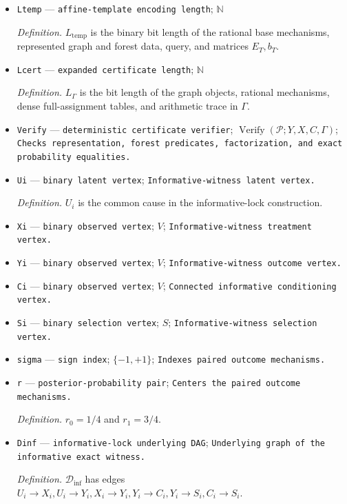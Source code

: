 \documentclass{article}
\begin{document}
\begin{itemize}
  \item \texttt{Ltemp} --- \texttt{affine-\allowbreak{}template encoding length}; \(\mathbb N\)
  \par\smallskip\noindent\emph{Definition.} \(L_{\mathrm{temp}}\) is the binary bit length of the rational base mechanisms, represented graph and forest data, query, and matrices \(E_T,b_T\).
  \item \texttt{Lcert} --- \texttt{expanded certificate length}; \(\mathbb N\)
  \par\smallskip\noindent\emph{Definition.} \(L_{\Gamma}\) is the bit length of the graph objects, rational mechanisms, dense full-assignment tables, and arithmetic trace in \(\Gamma\).
  \item \texttt{Verify} --- \texttt{deterministic certificate verifier}; \(\operatorname{Verify}(\mathcal P;Y,X,C,\Gamma)\); \texttt{Checks representation,\allowbreak{} forest predicates,\allowbreak{} factorization,\allowbreak{} and exact probability equalities.}
  \item \texttt{Ui} --- \texttt{binary latent vertex}; \texttt{Informative-\allowbreak{}witness latent vertex.}
  \par\smallskip\noindent\emph{Definition.} \(U_i\) is the common cause in the informative-lock construction.
  \item \texttt{Xi} --- \texttt{binary observed vertex}; \(V\); \texttt{Informative-\allowbreak{}witness treatment vertex.}
  \item \texttt{Yi} --- \texttt{binary observed vertex}; \(V\); \texttt{Informative-\allowbreak{}witness outcome vertex.}
  \item \texttt{Ci} --- \texttt{binary observed vertex}; \(V\); \texttt{Connected informative conditioning vertex.}
  \item \texttt{Si} --- \texttt{binary selection vertex}; \(S\); \texttt{Informative-\allowbreak{}witness selection vertex.}
  \item \texttt{sigma} --- \texttt{sign index}; \(\{-1,+1\}\); \texttt{Indexes paired outcome mechanisms.}
  \item \texttt{r} --- \texttt{posterior-\allowbreak{}probability pair}; \texttt{Centers the paired outcome mechanisms.}
  \par\smallskip\noindent\emph{Definition.} \(r_0=1/4\) and \(r_1=3/4\).
  \item \texttt{Dinf} --- \texttt{informative-\allowbreak{}lock underlying DAG}; \texttt{Underlying graph of the informative exact witness.}
  \par\smallskip\noindent\emph{Definition.} \(\mathcal D_{\mathrm{inf}}\) has edges \(U_i\to X_i,U_i\to Y_i,X_i\to Y_i,Y_i\to C_i,Y_i\to S_i,C_i\to S_i\).

\end{itemize}
\end{document}
